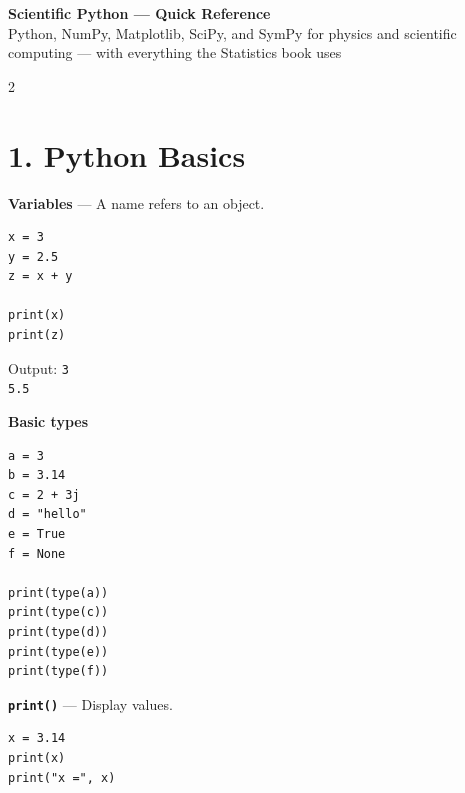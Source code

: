 \documentclass[10pt,a4paper]{article}
\begin{document}

\begin{center}
    {\LARGE\bfseries\color{navy}
    Scientific Python --- Quick Reference}\\[3pt]
    {\small
    Python, NumPy, Matplotlib, SciPy, and SymPy for physics and scientific computing --- with everything the Statistics book uses}
\end{center}

\vspace{3pt}


\begin{multicols}{2}
\raggedcolumns

\section*{1. Python Basics}

\begin{card}
\textbf{Variables} --- A name refers to an object.

\begin{lstlisting}[style=pythonstyle]
x = 3
y = 2.5
z = x + y

print(x)
print(z)
\end{lstlisting}

Output:
\texttt{3}\\
\texttt{5.5}
\end{card}

\begin{card}
\textbf{Basic types}

\begin{lstlisting}[style=pythonstyle]
a = 3
b = 3.14
c = 2 + 3j
d = "hello"
e = True
f = None

print(type(a))
print(type(c))
print(type(d))
print(type(e))
print(type(f))
\end{lstlisting}
\end{card}

\begin{card}
\textbf{\texttt{print()}} --- Display values.

\begin{lstlisting}[style=pythonstyle]
x = 3.14
print(x)
print("x =", x)
\end{lstlisting}


\end{card}
\end{multicols}
\end{document}
